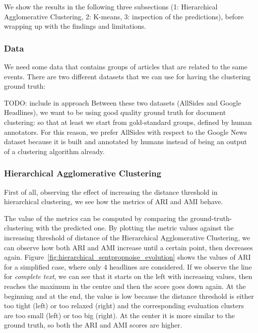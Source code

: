 
We show the results in the following three subsections (1: Hierarchical Agglomerative Clustering, 2: K-means, 3: inspection of the predictions), before wrapping up with the findings and limitations. %


\subsubsection{Data}

We need some data that contains groups of articles that are related to the same events. There are two different datasets that we can use for having the clustering ground truth:

TODO: include in approach
Between these two datasets (AllSides and Google Headlines), we want to be using good quality ground truth for document clustering: so that at least we start from gold-standard groups, defined by human annotators. For this reason, we prefer AllSides with respect to the Google News dataset because it is built and annotated by humans instead of being an output of a clustering algorithm already.

\subsubsection{Hierarchical Agglomerative Clustering}
First of all, observing the effect of increasing the distance threshold in hierarchical clustering, we see how the metrics of ARI and AMI behave.

The value of the metrics can be computed by comparing the ground-truth-clustering with the predicted one.
By plotting the metric values against the increasing threshold of distance of the Hierarchical Agglomerative Clustering, we can observe how both ARI and AMI increase until a certain point, then decreases again.
Figure~\ref{fig:hierarchical_sentpropnoise_evolution} shows the values of ARI for a simplified case, where only $4$ headlines are considered. If we observe the line for \textit{complete text}, we can see that it starts on the left with increasing values, then reaches the maximum in the centre and then the score goes down again. At the beginning and at the end, the value is low because the distance threshold is either too tight (left) or too relaxed (right) and the corresponding evaluation clusters are too small (left) or too big (right).
At the center it is more similar to the ground truth, so both the ARI and AMI scores are higher.

